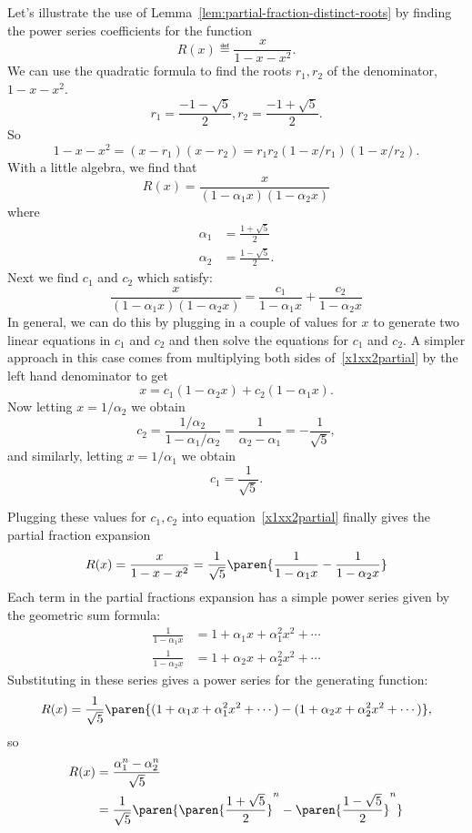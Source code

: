 Let's illustrate the use of Lemma~\ref{lem:partial-fraction-distinct-roots}
by finding the power series coefficients for the function
\[
R(x) \eqdef \frac{x}{1 - x - x^2}.
\]
We can use the quadratic formula to find the roots $r_1,r_2$ of the denominator, $1 - x - x^2$.
\[
r_1 = \frac{-1 -\sqrt{5}}{2}, r_2 = \frac{-1 + \sqrt{5}}{2}.
\]
So
\[
1 - x - x^2 = (x - r_1)(x - r_2) = r_1r_2(1-x/r_1)(1-x/r_2).
\]
With a little algebra, we find that
\[
R(x) = \frac{x}{(1-\alpha_1 x)(1-\alpha_2 x)}
\]
where
\begin{align*}
\alpha_1 & = \frac{1 + \sqrt{5}}{2}\\
\alpha_2 & = \frac{1 - \sqrt{5}}{2}.
\end{align*}
Next we find $c_1$ and $c_2$ which satisfy:
\begin{equation}\label{x1xx2partial}
\frac{x}{(1-\alpha_1 x)(1-\alpha_2 x)} =
      \frac{c_1}{1 - \alpha_1 x} + \frac{c_2}{1 - \alpha_2 x}
\end{equation}
In general, we can do this by plugging in a couple of values for $x$
to generate two linear equations in $c_1$ and $c_2$ and then solve the
equations for $c_1$ and $c_2$.  A simpler approach in this case comes
from multiplying both sides of~\eqref{x1xx2partial} by the left hand
denominator to get
\[
x = c_1(1 - \alpha_2 x) + c_2(1 - \alpha_1 x).
\]
Now letting $x = 1/\alpha_2$ we obtain
\[
c_2 = \frac{1/\alpha_2}{1-\alpha_1/\alpha_2} = \frac{1}{\alpha_2 - \alpha_1} = -\frac{1}{\sqrt{5}},
\]
and similarly, letting $x = 1/\alpha_1$ we obtain
\[
c_1 =\frac{1}{\sqrt{5}}.
\]
\iffalse
\begin{gather*}
c_1 = \frac{1}{\alpha_1 - \alpha_2} = \frac{1}{\sqrt{5}} \\
c_2 = \frac{-1}{\alpha_1 - \alpha_2} = -\frac{1}{\sqrt{5}}
\end{gather*}
\fi
Plugging these values for $c_1,c_2$ into
equation~\eqref{x1xx2partial} finally gives the partial fraction
expansion
%
\[
R(x) = \frac{x}{1 - x - x^2} =
      \frac{1}{\sqrt{5}}
      \paren{\frac{1}{1 - \alpha_1 x} - \frac{1}{1 - \alpha_2 x}}
\]
%
Each term in the partial fractions expansion has a simple power series
given by the geometric sum formula:
%
\begin{align*}
\frac{1}{1 - \alpha_1 x} & = 1 + \alpha_1 x + \alpha_1^2 x^2 + \cdots \\
\frac{1}{1 - \alpha_2 x} & = 1 + \alpha_2 x + \alpha_2^2 x^2 + \cdots
\end{align*}
%
Substituting in these series gives a power series for the generating
function:
%
\[
R(x)  =  \frac{1}{\sqrt{5}}
      \paren{(1 + \alpha_1 x + \alpha_1^2 x^2 + \cdots) -
      (1 + \alpha_2 x + \alpha_2^2 x^2 + \cdots)},
\]
so
\begin{align}
 [x^n]R(x) & = \frac{\alpha_1^n - \alpha_2^n}{\sqrt{5}} \notag \\
           & = \frac{1}{\sqrt{5}}
      \paren{
      \paren{\frac{1 + \sqrt{5}}{2}}^n -
      \paren{\frac{1 - \sqrt{5}}{2}}^n}\label{fib-coeff}
\end{align}

